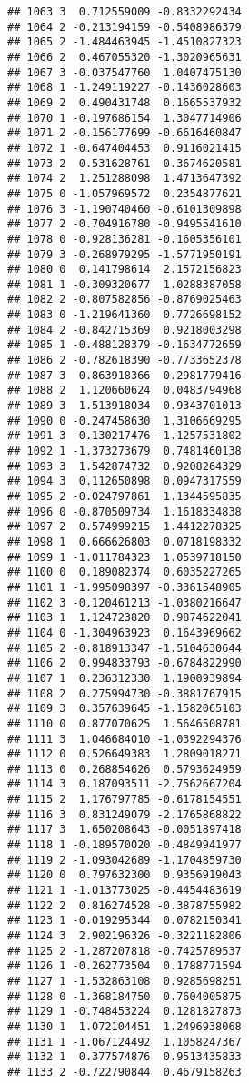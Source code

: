 \documentclass[
]{article}
\begin{document}
\begin{verbatim}
## 1063 3  0.712559009 -0.8332292434
## 1064 2 -0.213194159 -0.5408986379
## 1065 2 -1.484463945 -1.4510827323
## 1066 2  0.467055320 -1.3020965631
## 1067 3 -0.037547760  1.0407475130
## 1068 1 -1.249119227 -0.1436028603
## 1069 2  0.490431748  0.1665537932
## 1070 1 -0.197686154  1.3047714906
## 1071 2 -0.156177699 -0.6616460847
## 1072 1 -0.647404453  0.9116021415
## 1073 2  0.531628761  0.3674620581
## 1074 2  1.251288098  1.4713647392
## 1075 0 -1.057969572  0.2354877621
## 1076 3 -1.190740460 -0.6101309898
## 1077 2 -0.704916780 -0.9495541610
## 1078 0 -0.928136281 -0.1605356101
## 1079 3 -0.268979295 -1.5771950191
## 1080 0  0.141798614  2.1572156823
## 1081 1 -0.309320677  1.0288387058
## 1082 2 -0.807582856 -0.8769025463
## 1083 0 -1.219641360  0.7726698152
## 1084 2 -0.842715369  0.9218003298
## 1085 1 -0.488128379 -0.1634772659
## 1086 2 -0.782618390 -0.7733652378
## 1087 3  0.863918366  0.2981779416
## 1088 2  1.120660624  0.0483794968
## 1089 3  1.513918034  0.9343701013
## 1090 0 -0.247458630  1.3106669295
## 1091 3 -0.130217476 -1.1257531802
## 1092 1 -1.373273679  0.7481460138
## 1093 3  1.542874732  0.9208264329
## 1094 3  0.112650898  0.0947317559
## 1095 2 -0.024797861  1.1344595835
## 1096 0 -0.870509734  1.1618334838
## 1097 2  0.574999215  1.4412278325
## 1098 1  0.666626803  0.0718198332
## 1099 1 -1.011784323  1.0539718150
## 1100 0  0.189082374  0.6035227265
## 1101 1 -1.995098397 -0.3361548905
## 1102 3 -0.120461213 -1.0380216647
## 1103 1  1.124723820  0.9874622041
## 1104 0 -1.304963923  0.1643969662
## 1105 2 -0.818913347 -1.5104630644
## 1106 2  0.994833793 -0.6784822990
## 1107 1  0.236312330  1.1900939894
## 1108 2  0.275994730 -0.3881767915
## 1109 3  0.357639645 -1.1582065103
## 1110 0  0.877070625  1.5646508781
## 1111 3  1.046684010 -1.0392294376
## 1112 0  0.526649383  1.2809018271
## 1113 0  0.268854626  0.5793624959
## 1114 3  0.187093511 -2.7562667204
## 1115 2  1.176797785 -0.6178154551
## 1116 3  0.831249079 -2.1765868822
## 1117 3  1.650208643 -0.0051897418
## 1118 1 -0.189570020 -0.4849941977
## 1119 2 -1.093042689 -1.1704859730
## 1120 0  0.797632300  0.9356919043
## 1121 1 -1.013773025 -0.4454483619
## 1122 2  0.816274528 -0.3878755982
## 1123 1 -0.019295344  0.0782150341
## 1124 3  2.902196326 -0.3221182806
## 1125 2 -1.287207818 -0.7425789537
## 1126 1 -0.262773504  0.1788771594
## 1127 1 -1.532863108  0.9285698251
## 1128 0 -1.368184750  0.7604005875
## 1129 1 -0.748453224  0.1281827873
## 1130 1  1.072104451  1.2496938068
## 1131 1 -1.067124492  1.1058247367
## 1132 1  0.377574876  0.9513435833
## 1133 2 -0.722790844  0.4679158263

\end{verbatim}
\end{document}
